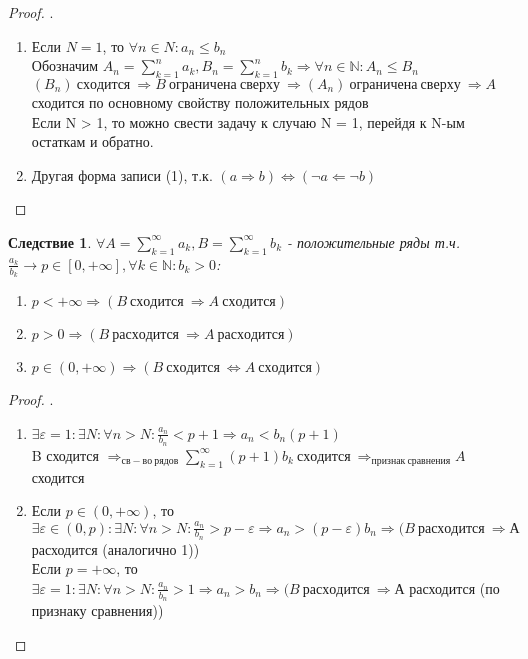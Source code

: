\documentclass[11pt,a4paper,titlepage]{article}
\newtheorem*{corollary}{Следствие}
\renewcommand{\implies}{\Rightarrow}
\newcommand{\bimplies}{\Leftarrow}
\renewcommand{\iff}{\Leftrightarrow}
\renewcommand{\epsilon}{\varepsilon}
\newcommand{\N}{\mathbb{N}}
\begin{document}
    \begin{proof}
        .\\
        \begin{enumerate}
            \item Если $N = 1$, то $\forall n \in N: a_n \leq b_n$\\
            Обозначим $A_n = \sum_{k=1}^n a_k, B_n = \sum_{k=1}^n b_k \implies \forall n \in \N: A_n \leq B_n$\\
            $(B_n)\ сходится\ \implies B\ ограничена\ сверху\ \implies (A_n)\ ограничена\ сверху\ \implies A$ сходится по основному свойству положительных рядов\\
            Если N > 1, то можно свести задачу к случаю N = 1, перейдя к N-ым остаткам и обратно.
            \item Другая форма записи (1), т.к. $(a \implies b) \iff (\lnot a \bimplies \lnot b)$
        \end{enumerate}
    \end{proof}

    \begin{corollary}
        $\forall A = \sum_{k=1}^\infty a_k, B = \sum_{k=1}^\infty b_k$ - положительные ряды т.ч. $\frac{a_k}{b_k}\to p \in [0, +\infty], \forall k \in \N: b_k > 0$:
        \begin{enumerate}
            \item $p < +\infty \implies (B\ сходится\ \implies A\ сходится)$
            \item $p > 0 \implies (B\ расходится\ \implies A\ расходится)$
            \item $p \in (0,+\infty) \implies (B\ сходится\ \iff A\ сходится)$
        \end{enumerate}
    \end{corollary}

    \begin{proof}
        .\\
        \begin{enumerate}
            \item $\exists \epsilon = 1: \exists N: \forall n > N: \frac{a_n}{b_n} < p + 1 \implies a_n < b_n (p+1)$\\
            B сходится $\implies_{св-во\ рядов} \sum_{k=1}^\infty(p+1)b_k\ сходится\ \implies_{признак\ сравнения} A$ сходится
            \item Если $p \in (0, +\infty)$, то $\exists \epsilon \in (0, p): \exists N: \forall n > N: \frac{a_n}{b_n} > p - \epsilon \implies a_n > (p - \epsilon)b_n \implies (B\ расходится\ \implies А$ расходится (аналогично 1))\\
            Если $p = +\infty$, то $\exists \epsilon = 1: \exists N: \forall n > N: \frac{a_n}{b_n} > 1 \implies a_n > b_n \implies (B\ расходится\ \implies А$ расходится (по признаку сравнения))
        \end{enumerate}
    \end{proof}
\end{document}
